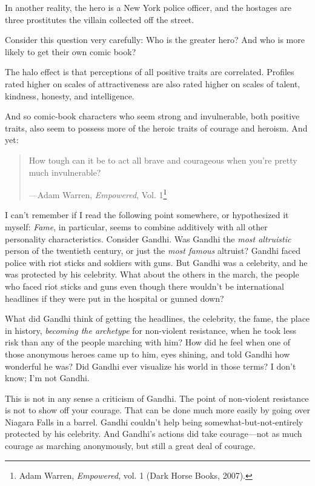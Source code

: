 {
 In another reality, the hero is a New York police officer, and the
hostages are three prostitutes the villain collected off the street.}

{
 Consider this question very carefully: Who is the greater hero?
And who is more likely to get their own comic book?}

{
 The halo effect is that perceptions of all positive traits are
correlated. Profiles rated higher on scales of attractiveness are also
rated higher on scales of talent, kindness, honesty, and intelligence.}

{
 And so comic-book characters who seem strong and invulnerable,
both positive traits, also seem to possess more of the heroic traits of
courage and heroism. And yet:}

\begin{quote}
{
 How tough can it be to act all brave and courageous when
you're pretty much invulnerable?}

{\raggedleft
 {}---Adam Warren, \textit{Empowered}, Vol. 1\footnote{Adam Warren, \textit{Empowered}, vol. 1 (Dark Horse Books,
2007).}
\par}
\end{quote}


{
 I can't remember if I read the following point
somewhere, or hypothesized it myself: \textit{Fame}, in particular,
seems to combine additively with all other personality characteristics.
Consider Gandhi. Was Gandhi the \textit{most altruistic} person of the
twentieth century, or just the \textit{most famous} altruist? Gandhi
faced police with riot sticks and soldiers with guns. But Gandhi was a
celebrity, and he was protected by his celebrity. What about the others
in the march, the people who faced riot sticks and guns even though
there wouldn't be international headlines if they were
put in the hospital or gunned down?}

{
 What did Gandhi think of getting the headlines, the celebrity, the
fame, the place in history, \textit{becoming the archetype} for
non-violent resistance, when he took less risk than any of the people
marching with him? How did he feel when one of those anonymous heroes
came up to him, eyes shining, and told Gandhi how wonderful he was? Did
Gandhi ever visualize his world in those terms? I don't
know; I'm not Gandhi.}

{
 This is not in any sense a criticism of Gandhi. The point of
non-violent resistance is not to show off your courage. That can be
done much more easily by going over Niagara Falls in a barrel. Gandhi
couldn't help being somewhat-but-not-entirely protected
by his celebrity. And Gandhi's actions did take
courage---not as much courage as marching anonymously, but still a
great deal of courage.}

